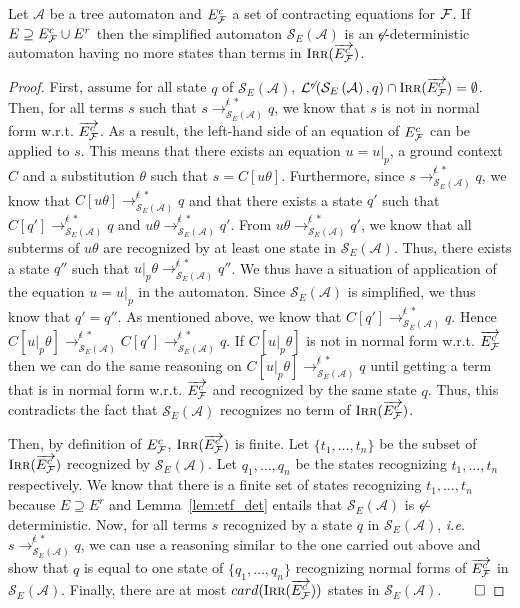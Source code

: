 \documentclass[a4paper,11pt]{llncs}
\newcommand{\A}{\mathcal{A}}
\renewcommand{\varepsilon}{\epsilon}
\newcommand{\epsifree}{\smash{\not}\varepsilon}
\newcommand{\Lange}{\mathcal{L}^{\epsifree}}
\newcommand{\F}{{\cal F}}
\def\ETF{E^{r}}
\def\Ecf{E^c_{\F}}
\DeclareMathOperator{\lirr}{I\textsc{rr}}
\def\ERcf{\overrightarrow{\Ecf}}
\def\simpleq#1#2{\mathcal S_{#1}\left(#2\right)}
\newcommand{\rwne}{\rightarrow^{\not\epsilon\: *}_{\simpleq E \A}}
\theoremstyle{plain}
\begin{document}
\begin{lemma}
\label{lem:cardComp}
Let $\A$ be a tree automaton and $\Ecf$ a set of contracting equations for
$\F$. If $E\supseteq \Ecf \cup \ETF$ then the simplified automaton $\simpleq E \A$
is an $\epsifree$-deterministic automaton having no more states than terms in
$\lirr(\ERcf)$.  
\end{lemma}
\begin{proof}
  First, assume for all state $q$ of $\simpleq E \A$, $\Lange(\simpleq E \A,q)
  \cap \lirr(\ERcf) =\emptyset$. Then, for all terms $s$ such that $s \rwne q$, we know
  that $s$ is not in normal form w.r.t. $\ERcf$. As a result, the left-hand side
  of an equation of $\Ecf$ can be applied to $s$. This means that there exists an
  equation $u = u|_p$, a ground context $C$ and a substitution $\theta$ such
  that $s=C[u\theta]$. Furthermore, since $s \rwne q$, we know
  that $C[u\theta]\rwne q$ and that there exists a state $q'$
  such that $C[q'] \rwne q$ and $u\theta \rwne q'$. From $u\theta\rwne q'$, we know that all subterms of
  $u\theta$ are recognized by at least one state in $\simpleq E \A$. Thus, there
  exists a state $q''$ such that $u|_p\theta \rwne q''$. We thus
  have a situation of application of the equation $u = u|_p$ in the
  automaton. Since $\simpleq E \A$ is simplified, we thus know that $q'=q''$. As
  mentioned above, we know that $C[q'] \rwne q$. Hence
  $C[u|_p\theta] \rwne C[q'] \rwne q$. If
  $C[u|_p\theta]$ is not in normal form w.r.t. $\ERcf$ then we can do the same reasoning
  on $C[u|_p\theta] \rwne q$ until getting a term that is in
  normal form w.r.t. $\ERcf$ and recognized by the same state $q$. Thus, this
  contradicts the fact that $\simpleq E \A$ recognizes no term of $\lirr(\ERcf)$.

Then, by definition of $\Ecf$, $\lirr(\ERcf)$ is finite. Let $\{t_1, \ldots,
t_n\}$ be the subset of $\lirr(\ERcf)$ recognized by $\simpleq E
\A$. Let $q_1, \ldots, q_n$ be the states recognizing $t_1, \ldots, t_n$
respectively. We know that there is a finite set of states recognizing $t_1,
\ldots, t_n$ because $E \supseteq
\ETF$ and Lemma~\ref{lem:etf_det} entails that $\simpleq E \A$ is
$\epsifree$-deterministic. Now, for all terms $s$ recognized by a state $q$ in $\simpleq E
\A$, {\em i.e.} $s \rwne q$,  we can use a reasoning similar to the
one carried out above and show that $q$ is equal to one state of $\{q_1, \ldots,
q_n\}$ recognizing normal forms of $\ERcf$ in $\simpleq E \A$. Finally, there
are at most $card(\lirr(\ERcf))$ states in $\simpleq E \A$. $\qed$
\end{proof}
\end{document}
